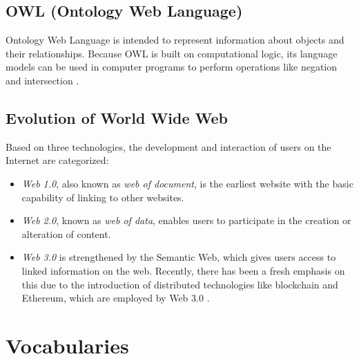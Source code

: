 \subsection{OWL (Ontology Web Language)}
Ontology Web Language is intended to represent information about objects and their relationships. Because OWL is built on computational logic, its language models can be used in computer programs to perform operations like negation and intersection \cite{Hector}.
\subsection{Evolution of World Wide Web}
Based on three technologies, the development and interaction of users on the Internet are categorized: \\
\begin{itemize}
\item\textit{Web 1.0}, also known as \textit{web of document}, is the earliest website with the basic capability of linking to other websites. \\
\item\textit{Web 2.0}, known as \textit{web of data}, enables users to participate in the creation or alteration of content.\\
\item\textit{Web 3.0} is strengthened by the Semantic Web, which gives users access to linked information on the web. Recently, there has been a fresh emphasis on this due to the introduction of distributed technologies like blockchain and Ethereum, which are employed by Web 3.0 \cite{Kujur}.
\end{itemize}

\section{Vocabularies}
